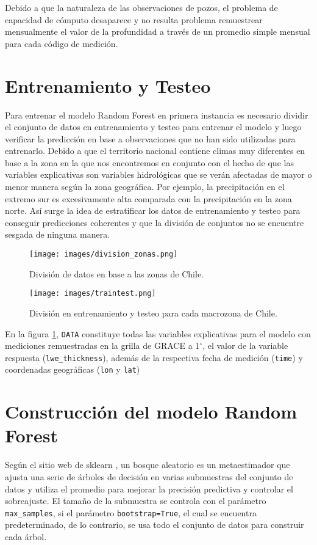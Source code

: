     Debido a que la naturaleza de las observaciones de pozos, el problema de capacidad de cómputo desaparece y no resulta problema remuestrear mensualmente el valor de la profundidad a través de 
    un promedio simple mensual para cada código de medición.
%   
%
%
%
%
%
%
\section{Entrenamiento y Testeo}
    Para entrenar el modelo Random Forest en primera instancia es necesario dividir el conjunto de datos en entrenamiento
    y testeo para entrenar el modelo y luego verificar la predicción en base a observaciones que no han sido utilizadas para 
    entrenarlo. Debido a que el territorio nacional contiene climas muy diferentes en base a la zona en la que nos encontremos
    en conjunto con el hecho de que las variables explicativas son variables hidrológicas que se verán afectadas de mayor o menor manera
    según la zona geográfica. Por ejemplo, la precipitación en el extremo sur es excesivamente alta comparada con la precipitación en 
    la zona norte. Así surge la idea de estratificar los datos de entrenamiento y testeo para conseguir predicciones coherentes 
    y que la división de conjuntos no se encuentre sesgada de ninguna manera.
    \begin{figure}[H]
        \centering
              \texttt{[image: images/division\_zonas.png]}
              \vskip -0.1in
        \caption[División de datos por macrozonas de Chile]{\footnotesize División de datos en base a las zonas de Chile.}
        \label{division}
    \end{figure}

    \begin{figure}[H]
        \centering
            \texttt{[image: images/traintest.png]}
              \vskip -0.1in
        \caption[Entrenamiento y testeo mediante macrozonas]{\footnotesize División en entrenamiento y testeo para cada macrozona de Chile.}
        \label{traintest}
    \end{figure}

    En la figura \ref{division}, \texttt{DATA} constituye todas las variables explicativas para el modelo con mediciones remuestradas en la grilla de GRACE
    a 1$^{\circ}$, el valor de la variable respuesta (\texttt{lwe\_thickness}), además de la respectiva fecha de medición (\texttt{time}) y 
    coordenadas geográficas (\texttt{lon} y \texttt{lat})
%
%
%
%
\section{Construcción del modelo Random Forest}
Según el sitio web de sklearn \cite{rfskl}, un bosque aleatorio es un metaestimador 
que ajusta una serie de árboles de decisión en varias submuestras 
del conjunto de datos y utiliza el promedio para mejorar la precisión predictiva y controlar el sobreajuste. 
El tamaño de la submuestra se controla con el parámetro \texttt{max\_samples}, si el parámetro \texttt{bootstrap=True}, el cual se encuentra predeterminado, 
de lo contrario, se usa todo el conjunto de datos para construir cada árbol.

